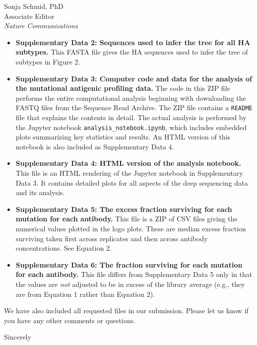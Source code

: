 \documentclass[a4paper,11pt]{letter}
\begin{document}
\begin{letter}{Sonja Schmid, PhD \\ Associate Editor \\ \textit{Nature Communications} }
\begin{itemize}
\begin{itemize}
\item {\bf Supplementary Data 2: Sequences used to infer the tree for all HA subtypes.}
This FASTA file gives the HA sequences used to infer the tree of subtypes in Figure 2.

\item {\bf Supplementary Data 3: Computer code and data for the analysis of the mutational antigenic profiling data.}
The code in this ZIP file performs the entire computational analysis beginning with downloading the FASTQ files from the Sequence Read Archive.
The ZIP file contains a \texttt{README} file that explains the contents in detail.
The actual analysis is performed by the Jupyter notebook \texttt{analysis\_notebook.ipynb}, which includes embedded plots summarizing key statistics and results.
An HTML version of this notebook is also included as Supplementary Data 4.

\item {\bf Supplementary Data 4: HTML version of the analysis notebook.}
This file is an HTML rendering of the Jupyter notebook in Supplementary Data 3.
It contains detailed plots for all aspects of the deep sequencing data and its analysis.

\item {\bf Supplementary Data 5: The excess fraction surviving for each mutation for each antibody.}
This file is a ZIP of CSV files giving the numerical values plotted in the logo plots.
These are median excess fraction surviving taken first across replicates and then across antibody concentrations.
See Equation 2.

\item {\bf Supplementary Data 6: The fraction surviving for each mutation for each antibody.}
This file differs from Supplementary Data 5 only in that the values are \emph{not} adjusted to be in excess of the library average (e.g., they are from Equation 1 rather than Equation 2).

\end{itemize}
\end{itemize}

We have also included all requested files in our submission.
Please let us know if you have any other comments or questions.

\closing{Sincerely} %

\end{letter}
\end{document}
